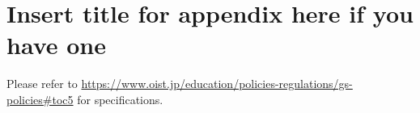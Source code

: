 

\chapter{Insert title for appendix here if you have one} \label{appA}

Please refer to \url{https://www.oist.jp/education/policies-regulations/gs-policies#toc5} for specifications.
